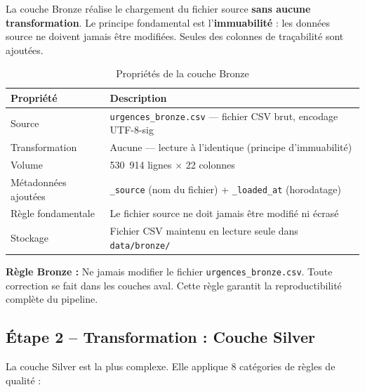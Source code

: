 \documentclass[12pt,a4paper]{report}
\begin{document}
	La couche Bronze réalise le chargement du fichier source \textbf{sans aucune transformation}.
	Le principe fondamental est l'\textbf{immuabilité} : les données source ne doivent jamais
	être modifiées. Seules des colonnes de traçabilité sont ajoutées.
	
	\begin{table}[H]
		\centering
		\caption{Propriétés de la couche Bronze}
		\renewcommand{\arraystretch}{1.3}
		\begin{tabularx}{\textwidth}{lX}
			\toprule
			\textbf{Propriété} & \textbf{Description} \\
			\midrule
			Source              & \texttt{urgences\_bronze.csv} — fichier CSV brut, encodage UTF-8-sig \\
			Transformation      & Aucune — lecture à l'identique (principe d'immuabilité) \\
			Volume              & 530~914 lignes $\times$ 22 colonnes \\
			Métadonnées ajoutées & \texttt{\_source} (nom du fichier) + \texttt{\_loaded\_at} (horodatage) \\
			Règle fondamentale  & Le fichier source ne doit jamais être modifié ni écrasé \\
			Stockage            & Fichier CSV maintenu en lecture seule dans \texttt{data/bronze/} \\
			\bottomrule
		\end{tabularx}
	\end{table}
	
	\begin{warnbox}
		\textbf{Règle Bronze :} Ne jamais modifier le fichier \texttt{urgences\_bronze.csv}.
		Toute correction se fait dans les couches aval. Cette règle garantit la reproductibilité
		complète du pipeline.
	\end{warnbox}
	
	\subsection{Étape 2 -- Transformation : Couche Silver}
	
	La couche Silver est la plus complexe. Elle applique 8 catégories de règles de qualité :
	
\end{document}

